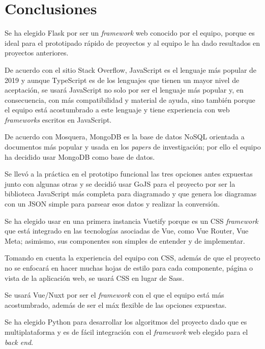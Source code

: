 \section{Conclusiones}


Se ha elegido Flask por ser un \textit{framework} web conocido por el equipo, porque es ideal para el prototipado rápido de proyectos y al equipo le ha dado resultados en proyectos anteriores.

De acuerdo con el sitio Stack Overflow\cite{noauthor_stack_nodate}, JavaScript es el lenguaje más popular de 2019 y aunque TypeScript es de los lenguajes que tienen un mayor nivel de aceptación, se usará JavaScript no solo por ser el lenguaje más popular y, en consecuencia, con más compatibilidad y material de ayuda, sino también porque el equipo está acostumbrado a este lenguaje y tiene experiencia con web \textit{frameworks} escritos en JavaScript.

De acuerdo con Mosquera\cite{martinez-mosquera_modeling_2020}, MongoDB es la base de datos NoSQL orientada a documentos más popular y usada en los \textit{papers} de investigación; por ello el equipo ha decidido usar MongoDB como base de datos.

Se llevó a la práctica en el prototipo funcional las tres opciones antes expuestas junto con algunas otras y se decidió usar GoJS para el proyecto por ser la biblioteca JavaScript más completa para diagramado y que genera los diagramas con un JSON simple para parsear esos datos y realizar la conversión.


Se ha elegido usar en una primera instancia Vuetify porque es un CSS \textit{framework} que está integrado en las tecnologías asociadas de Vue, como Vue Router, Vue Meta; asimismo, sus componentes son simples de entender y de implementar.


Tomando en cuenta la experiencia del equipo con CSS, además de que el proyecto no se enfocará en hacer muchas hojas de estilo para cada componente, página o vista de la aplicación web, se usará CSS en lugar de Sass.

Se usará Vue/Nuxt por ser el \textit{framework} con el que el equipo está más acostumbrado, además de ser el máx flexible de las opciones expuestas.

Se ha elegido Python para desarrollar los algoritmos del proyecto dado que es multiplataforma y es de fácil integración con el \textit{framework} web elegido para el \textit{back end}.
